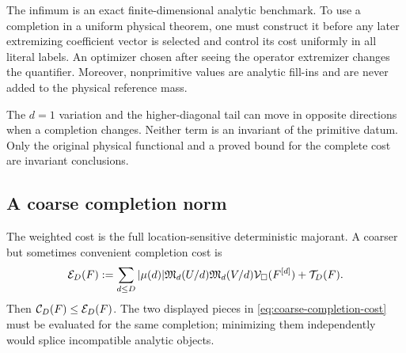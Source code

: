 \begin{remark}
\label{rem:completion-quantifier}
The infimum is an exact finite-dimensional analytic benchmark.  To use a
completion in a uniform physical theorem, one must construct it before any
later extremizing coefficient vector is selected and control its cost
uniformly in all literal labels.  An optimizer chosen after seeing the
operator extremizer changes the quantifier.  Moreover, nonprimitive values
are analytic fill-ins and are never added to the physical reference mass.
\end{remark}

\begin{remark}
The \(d=1\) variation and the higher-diagonal tail can move in opposite
directions when a completion changes.  Neither term is an invariant of
the primitive datum.  Only the original physical functional and a proved
bound for the complete cost are invariant conclusions.
\end{remark}

\subsection{A coarse completion norm}

The weighted cost is the full location-sensitive deterministic majorant.
A coarser but sometimes convenient completion cost is
\begin{equation}
 \mathcal E_D(F)
 :=
 \sum_{d\le D}|\mu(d)|
 \mathfrak M_d(U/d)\mathfrak M_d(V/d)
 \mathcal V_\square(F^{[d]})
 +
 \mathcal T_D(F).
 \label{eq:coarse-completion-cost}
\end{equation}
Then \(\mathcal C_D(F)\le\mathcal E_D(F)\).  The two displayed pieces in
\eqref{eq:coarse-completion-cost} must be evaluated for the same completion;
minimizing them independently would splice incompatible analytic objects.
